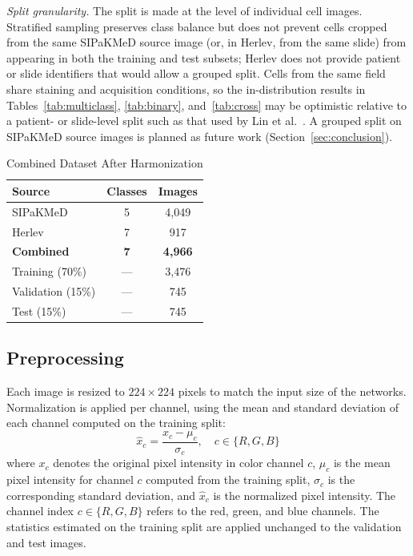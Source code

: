 \documentclass[runningheads]{llncs}
\begin{document}
\textit{Split granularity.} The split is made at the level of individual cell images. Stratified sampling preserves class balance but does not prevent cells cropped from the same SIPaKMeD source image (or, in Herlev, from the same slide) from appearing in both the training and test subsets; Herlev does not provide patient or slide identifiers that would allow a grouped split. Cells from the same field share staining and acquisition conditions, so the in-distribution results in Tables~\ref{tab:multiclass}, \ref{tab:binary}, and~\ref{tab:cross} may be optimistic relative to a patient- or slide-level split such as that used by Lin et al.\ \cite{lin2019}. A grouped split on SIPaKMeD source images is planned as future work (Section~\ref{sec:conclusion}).

\begin{table}[t]
\caption{Combined Dataset After Harmonization}
\label{tab:dataset}
\centering
\begin{tabular}{lcc}
\toprule
\textbf{Source} & \textbf{Classes} & \textbf{Images}\\
\midrule
SIPaKMeD & 5 & 4,049\\
Herlev   & 7 & 917\\
\midrule
\textbf{Combined} & \textbf{7} & \textbf{4,966}\\
\quad Training (70\%) & --- & 3,476\\
\quad Validation (15\%) & --- & 745\\
\quad Test (15\%) & --- & 745\\
\bottomrule
\end{tabular}
\end{table}

\subsection{Preprocessing}
\label{sec:preproc}

Each image is resized to $224\times224$ pixels to match the input size of the networks. Normalization is applied per channel, using the mean and standard deviation of each channel computed on the training split:
\begin{equation}
    \hat{x}_c = \frac{x_c - \mu_c}{\sigma_c}, \quad c \in \{R,G,B\}
    \label{eq:norm}
\end{equation}
where $x_c$ denotes the original pixel intensity in color channel $c$, $\mu_c$ is the mean pixel intensity for channel $c$ computed from the training split, $\sigma_c$ is the corresponding standard deviation, and $\hat{x}_c$ is the normalized pixel intensity. The channel index $c\in\{R,G,B\}$ refers to the red, green, and blue channels. The statistics estimated on the training split are applied unchanged to the validation and test images.
\end{document}
